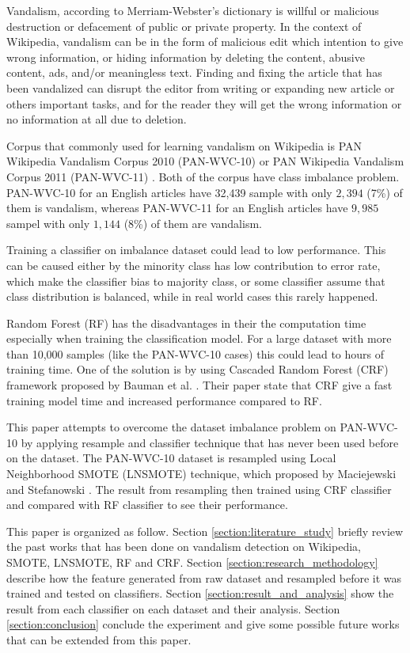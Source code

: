 Vandalism, according to Merriam-Webster's dictionary is willful or malicious
destruction or defacement of public or private property.
In the context of Wikipedia, vandalism can be in the form of malicious edit
which intention to give wrong information, or hiding information by deleting
the content, abusive content, ads, and/or meaningless text.
Finding and fixing the article that has been vandalized can disrupt the editor
from writing or expanding new article or others important tasks, and for the
reader they will get the wrong information or no information at all due to
deletion.

Corpus that commonly used for learning vandalism on Wikipedia is PAN Wikipedia
Vandalism Corpus 2010 (PAN-WVC-10)
\cite{potthast:2010b}
or PAN Wikipedia Vandalism Corpus 2011 (PAN-WVC-11)
\cite{potthast:2010b}.
Both of the corpus have class imbalance problem.
PAN-WVC-10 for an English articles have 32,439 sample with only $2,394$ (7\%)
of them is vandalism, whereas PAN-WVC-11 for an English articles have $9,985$
sampel with only $1,144$ (8\%) of them are vandalism.

Training a classifier on imbalance dataset could lead to low performance.
This can be caused either by the minority class has low contribution to error
rate, which make the classifier bias to majority class, or some classifier
assume that class distribution is balanced, while in real world cases this
rarely happened.

Random Forest (RF) has the disadvantages in their the computation time
especially when training the classification model.  For a large dataset with
more than 10,000 samples (like the PAN-WVC-10 cases) this could lead to hours
of training time.  One of the solution is by using Cascaded Random Forest (CRF)
framework proposed by Bauman et al.  \cite{baumann2013cascaded}.  Their paper
state that CRF give a fast training model time and increased performance
compared to RF.

This paper attempts to overcome the dataset imbalance problem on PAN-WVC-10 by
applying resample and classifier technique that has never been used before on
the dataset.
The PAN-WVC-10 dataset is resampled using Local Neighborhood SMOTE (LNSMOTE)
technique,
which proposed by Maciejewski and Stefanowski
\cite{maciejewski2011local}.
The result from resampling then trained using CRF classifier and compared with
RF classifier to see their performance.

This paper is organized as follow.
Section \ref{section:literature_study} briefly review the past works that has
been done on vandalism detection on Wikipedia, SMOTE, LNSMOTE, RF and CRF.
Section \ref{section:research_methodology} describe how the feature generated
from raw dataset and resampled before it was trained and tested on classifiers.
Section \ref{section:result_and_analysis} show the result from each classifier
on each dataset and their analysis.
Section \ref{section:conclusion} conclude the experiment and
give some possible future works that can be extended from this paper.

